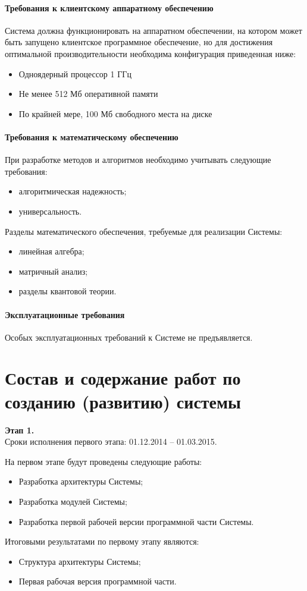 \subsubsection{Требования к клиентскому аппаратному обеспечению}
Система должна функционировать на аппаратном обеспечении, на котором может быть
запущено клиентское программное обеспечение, но для достижения оптимальной
производительности необходима конфигурация приведенная ниже:
\begin{itemize}
  \item Одноядерный процессор 1 ГГц
  \item Не менее 512 Мб оперативной памяти
  \item По крайней мере, 100 Мб свободного места на диске
\end{itemize}

\subsubsection{Требования к математическому обеспечению}
При разработке методов и алгоритмов необходимо учитывать следующие требования:
\begin{itemize}
  \item алгоритмическая надежность;
  \item универсальность.
\end{itemize}
Разделы математического обеспечения, требуемые для реализации Системы:
\begin{itemize}
  \item линейная алгебра;
  \item матричный анализ;
  \item разделы квантовой теории.
\end{itemize}

\subsubsection{Эксплуатационные требования}
Особых эксплуатационных требований к Системе не предъявляется.

\chapter{Состав и содержание работ по созданию (развитию) системы}
\textbf{Этап 1.}\\
Сроки исполнения первого этапа: 01.12.2014 -- 01.03.2015.

На первом этапе будут проведены следующие работы:
\begin{itemize}
  \item Разработка архитектуры Системы;
  \item Разработка модулей Системы;
  \item Разработка первой рабочей версии программной части Системы.
\end{itemize}
Итоговыми результатами по первому этапу являются:
\begin{itemize}
  \item Структура архитектуры Системы;
  \item Первая рабочая версия программной части.
\end{itemize}


